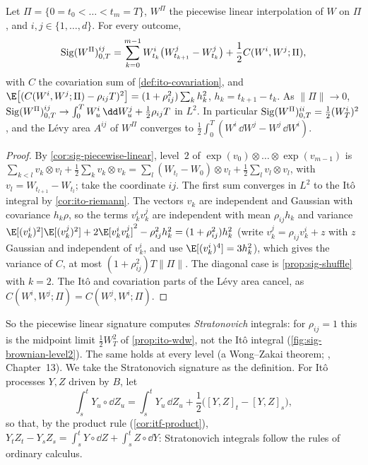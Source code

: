 \begin{proposition}\label{prop:sig-brownian-level2}
Let $\Pi=\{0=t_0<\dots<t_m=T\}$, $W^\Pi$ the piecewise linear interpolation of $W$ on $\Pi$, and
$i,j\in\{1,\dots,d\}$. For every outcome,
\[
  \operatorname{Sig}(W^\Pi)^{ij}_{0,T}=\sum_{k=0}^{m-1}W^i_{t_k}\big(W^j_{t_{k+1}}-W^j_{t_k}\big)+\frac12C(W^i,W^j;\Pi),
\]
with $C$ the covariation sum of \cref{def:ito-covariation}, and $\E\big[(C(W^i,W^j;\Pi)-\rho_{ij}T)^2\big]=(1+\rho_{ij}^2)\sum_kh_k^2$,
$h_k=t_{k+1}-t_k$. As $\|\Pi\|\to0$,
$\sigSig(W^\Pi)^{ij}_{0,T}\to\int_0^TW^i_u\,\dd W^j_u+\frac12\rho_{ij}T$ in $L^2$. In particular
$\operatorname{Sig}(W^\Pi)^{ii}_{0,T}=\frac12(W^i_T)^2$, and the L\'evy area $A^{ij}$ of $W^\Pi$ converges to
$\frac12\int_0^T(W^i\,\dd W^j-W^j\,\dd W^i)$.
\end{proposition}

\begin{proof}
By \cref{cor:sig-piecewise-linear}, level~$2$ of $\exp(v_0)\otimes\dots\otimes\exp(v_{m-1})$ is
$\sum_{k<l}v_k\otimes v_l+\frac12\sum_kv_k\otimes v_k=\sum_l(W_{t_l}-W_0)\otimes v_l+\frac12\sum_lv_l\otimes v_l$, with
$v_l=W_{t_{l+1}}-W_{t_l}$; take the coordinate $ij$. The first sum converges in $L^2$ to the It\^o integral
by \cref{cor:ito-riemann}. The vectors $v_k$ are independent and Gaussian with covariance $h_k\rho$, so the
terms $v_k^iv_k^j$ are independent with mean $\rho_{ij}h_k$ and variance
$\E[(v^i_k)^2]\E[(v^j_k)^2]+2\E[v^i_kv^j_k]^2-\rho_{ij}^2h_k^2=(1+\rho_{ij}^2)h_k^2$ (write
$v^j_k=\rho_{ij}v^i_k+z$ with $z$ Gaussian and independent of $v^i_k$, and use $\E[(v^i_k)^4]=3h_k^2$), which gives the
variance of $C$, at most $(1+\rho_{ij}^2)T\|\Pi\|$. The diagonal
case is \cref{prop:sig-shuffle} with $k=2$. The It\^o and covariation parts of the L\'evy area cancel, as
$C(W^i,W^j;\Pi)=C(W^j,W^i;\Pi)$.
\end{proof}

So the piecewise linear signature computes \emph{Stratonovich} integrals: for $\rho_{ij}=1$ this is the
midpoint limit $\frac12W_T^2$ of \cref{prop:ito-wdw}, not the It\^o integral (\cref{fig:sig-brownian-level2}).
The same holds at every level (a Wong--Zakai theorem; \textcite{friz-victoir-2010}, Chapter~13). We take
the Stratonovich signature as the definition. For It\^o processes $Y,Z$ driven by $B$, let
\[
  \int_s^tY_u\circ\dd Z_u=\int_s^tY_u\,\dd Z_u+\frac12\big([Y,Z]_t-[Y,Z]_s\big),
\]
so that, by the product rule (\cref{cor:itf-product}), $Y_tZ_t-Y_sZ_s=\int_s^tY\circ\dd Z+\int_s^tZ\circ\dd Y$:
Stratonovich integrals follow the rules of ordinary calculus.

